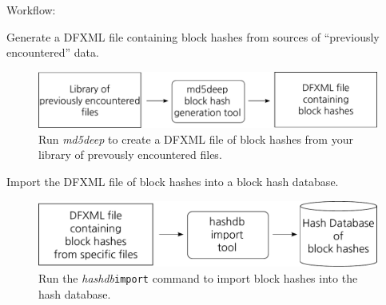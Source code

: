 \documentclass[12pt,twoside]{article}
\newcommand{\hdb}{\emph{hashdb}\xspace}
\newcommand{\mdd}{\emph{md5deep}\xspace}
\begin{document}
Workflow:
\begin{compactenum}
\item Generate a DFXML file containing block hashes
from sources of ``previously encountered'' data.

\begin{figure}[H]
  \center
  \includegraphics[scale=0.6]{drawings/md5deep}
  \caption*{Run \mdd to create a DFXML file of block hashes from your \\
            library of prevously encountered files.}
\end{figure}

\item Import the DFXML file of block hashes into a block hash database.

\begin{figure}[H]
  \center
  \includegraphics[scale=0.6]{drawings/import}
  \caption*{Run the \hdb \texttt{import} command
            to import block hashes into the hash database.}
\end{figure}

\end{compactenum}
\end{document}
